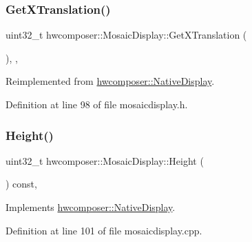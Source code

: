 \subsubsection{\texorpdfstring{Get\+X\+Translation()}{GetXTranslation()}}
{\footnotesize\ttfamily uint32\+\_\+t hwcomposer\+::\+Mosaic\+Display\+::\+Get\+X\+Translation (\begin{DoxyParamCaption}{ }\end{DoxyParamCaption})\hspace{0.3cm}{\ttfamily [inline]}, {\ttfamily [override]}, {\ttfamily [virtual]}}



Reimplemented from \mbox{\hyperlink{classhwcomposer_1_1NativeDisplay_a1f934e9ab6149fb35bd2868605c215dd}{hwcomposer\+::\+Native\+Display}}.



Definition at line 98 of file mosaicdisplay.\+h.


\begin{DoxyCode}{0}
\end{DoxyCode}
\mbox{\label{classhwcomposer_1_1MosaicDisplay_af15fda20d779888c521095542b505f9d}} 
\subsubsection{\texorpdfstring{Height()}{Height()}}
{\footnotesize\ttfamily uint32\+\_\+t hwcomposer\+::\+Mosaic\+Display\+::\+Height (\begin{DoxyParamCaption}{ }\end{DoxyParamCaption}) const\hspace{0.3cm}{\ttfamily [override]}, {\ttfamily [virtual]}}



Implements \mbox{\hyperlink{classhwcomposer_1_1NativeDisplay_a09a19377e64e1fed90ae8315a8e71864}{hwcomposer\+::\+Native\+Display}}.



Definition at line 101 of file mosaicdisplay.\+cpp.


\begin{DoxyCode}{0}
\end{DoxyCode}
\mbox{\label{classhwcomposer_1_1MosaicDisplay_af529c96ce14e717b11759fa45648ea68}} 
